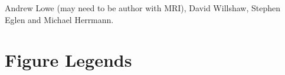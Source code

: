 \documentclass[10pt]{article}
\begin{document}
Andrew Lowe (may need to be author with MRI), David Willshaw, Stephen Eglen and
Michael Herrmann.

\newcommand{\myshortjournaltitles}{}

%

\section*{Figure Legends}
\end{document}
